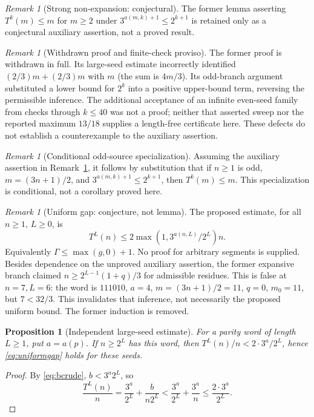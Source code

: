 \documentclass[11pt]{amsart}
\newtheorem{proposition}[theorem]{Proposition}
\theoremstyle{definition}
\theoremstyle{remark}
\newtheorem{remark}[theorem]{Remark}
\begin{document}
\begin{remark}[Strong non-expansion: conjectural]\label{lem:cycleex}
The former lemma asserting $T^k(m)\le m$ for $m\ge2$ under $3^{a(m,k)+1}\le2^{k+1}$ is retained only as a conjectural auxiliary assertion, not a proved result.
\end{remark}
\begin{remark}[Withdrawn proof and finite-check proviso]\label{rem:evenband}
The former proof is withdrawn in full. Its large-seed estimate incorrectly identified $(2/3)m+(2/3)m$ with $m$ (the sum is $4m/3$). Its odd-branch argument substituted a lower bound for $2^k$ into a positive upper-bound term, reversing the permissible inference. The additional acceptance of an infinite even-seed family from checks through $k\le40$ was not a proof; neither that asserted sweep nor the reported maximum $13/18$ supplies a length-free certificate here. These defects do not establish a counterexample to the auxiliary assertion.
\end{remark}
\begin{remark}[Conditional odd-source specialization]\label{cor:cycleex}
Assuming the auxiliary assertion in Remark~\ref{lem:cycleex}, it follows by substitution that if $n\ge1$ is odd, $m=(3n+1)/2$, and $3^{a(m,k)+1}\le2^{k+1}$, then $T^k(m)\le m$. This specialization is conditional, not a corollary proved here.
\end{remark}
\begin{remark}[Uniform gap: conjecture, not lemma]\label{lem:uniformgap}
The proposed estimate, for all $n\ge1$, $L\ge0$, is
\begin{equation}\label{eq:uniformgap}
T^L(n)\le2\max(1,3^{a(n,L)}/2^L)n.
\end{equation}
Equivalently $\Gamma\le\max(g,0)+1$. No proof for arbitrary segments is supplied. Besides dependence on the unproved auxiliary assertion, the former expansive branch claimed $n\ge2^{L-1}(1+q)/3$ for admissible residues. This is false at $n=7,L=6$: the word is $111010$, $a=4$, $m=(3n+1)/2=11$, $q=0$, $m_0=11$, but $7<32/3$. This invalidates that inference, not necessarily the proposed uniform bound. The former induction is removed.
\end{remark}
\begin{proposition}[Independent large-seed estimate]
For a parity word of length $L\ge1$, put $a=a(p)$. If $n\ge2^L$ has this word, then $T^L(n)/n<2\cdot3^a/2^L$, hence \eqref{eq:uniformgap} holds for these seeds.
\end{proposition}
\begin{proof}
By \eqref{eq:bcrude}, $b<3^a2^L$, so
\[
\frac{T^L(n)}n=\frac{3^a}{2^L}+\frac{b}{n2^L}
<\frac{3^a}{2^L}+\frac{3^a}{n}\le\frac{2\cdot3^a}{2^L}.
\]
\end{proof}
\end{document}
